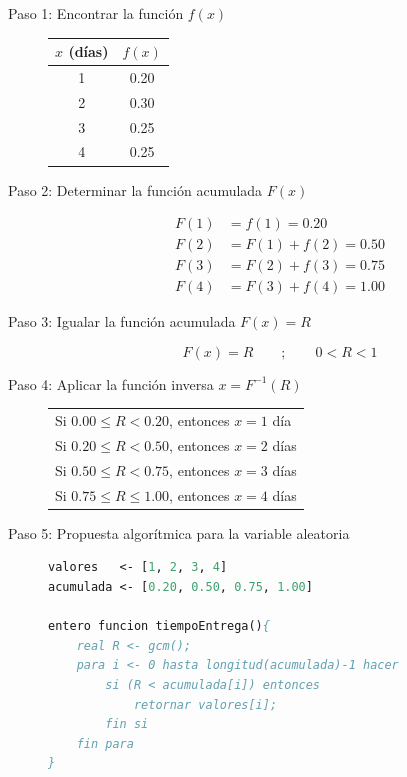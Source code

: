 \documentclass[12pt, a4paper]{article}
\begin{document}
\begin{description}
    \item[Paso 1: Encontrar la función $f(x)$]

    \begin{center}
    \begin{tabular}{cc}
    \toprule
    $x$ (días) & $f(x)$ \\
    \midrule
    1 & 0.20 \\ 2 & 0.30 \\ 3 & 0.25 \\ 4 & 0.25 \\
    \bottomrule
    \end{tabular}
    \end{center}

    \item[Paso 2: Determinar la función acumulada $F(x)$]

    \begin{align*}
    F(1) &= f(1) = 0.20 \\
    F(2) &= F(1)+f(2) = 0.50 \\
    F(3) &= F(2)+f(3) = 0.75 \\
    F(4) &= F(3)+f(4) = 1.00
    \end{align*}

    \item[Paso 3: Igualar la función acumulada $F(x) = R$]

    $$ F(x)=R \qquad ; \qquad 0 < R < 1 $$

    \item[Paso 4: Aplicar la función inversa $x=F^{-1}(R)$]

    \begin{center}
    \begin{tabular}{l}
    Si $0.00 \leq R < 0.20$, entonces $x=1$ día \\
    Si $0.20 \leq R < 0.50$, entonces $x=2$ días \\
    Si $0.50 \leq R < 0.75$, entonces $x=3$ días \\
    Si $0.75 \leq R \leq 1.00$, entonces $x=4$ días \\
    \end{tabular}
    \end{center}

    \item[Paso 5: Propuesta algorítmica para la variable aleatoria]

    \begin{lstlisting}[caption={tiempoEntrega()}, language=Pascal]
valores   <- [1, 2, 3, 4]
acumulada <- [0.20, 0.50, 0.75, 1.00]

entero funcion tiempoEntrega(){
    real R <- gcm();
    para i <- 0 hasta longitud(acumulada)-1 hacer
        si (R < acumulada[i]) entonces
            retornar valores[i];
        fin si
    fin para
}
    \end{lstlisting}
\end{description}
\end{document}
